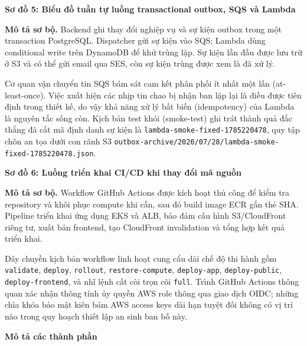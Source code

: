 \vspace{0.5em}\noindent\textbf{Sơ đồ 5: Biểu đồ tuần tự luồng transactional outbox, SQS và
Lambda}\par

\textbf{Mô tả sơ bộ.} Backend ghi thay đổi nghiệp vụ và sự kiện outbox
trong một transaction PostgreSQL. Dispatcher gửi sự kiện vào SQS; Lambda
dùng conditional write trên DynamoDB để khử trùng lặp. Sự kiện lần đầu
được lưu trữ ở S3 và có thể gửi email qua SES, còn sự kiện trùng được
xem là đã xử lý.

Cơ quan vận chuyển tin SQS bám sát cam kết phân phối ít nhất một lần
(at-least-once). Việc xuất hiện các nhịp tin chao bị nhận ban lặp lại là
điều được tiên định trong thiết kế, do vậy khả năng xử lý bất biến
(idempotency) của Lambda là nguyên tắc sống còn. Kịch bản test khói
(smoke-test) ghi trát thành quả đắc thắng đã cất mã định danh sự kiện là
\texttt{lambda-\allowbreak{}smoke-\allowbreak{}fixed-\allowbreak{}1785220478}, quy tập chôn an tọa dưới con
rãnh S3
\texttt{outbox-\allowbreak{}archive/\allowbreak{}2026/\allowbreak{}07/\allowbreak{}28/\allowbreak{}lambda-\allowbreak{}smoke-\allowbreak{}fixed-\allowbreak{}1785220478.\allowbreak{}json}.

\vspace{0.5em}\noindent\textbf{Sơ đồ 6: Luồng triển khai CI/CD khi thay đổi mã
nguồn}\par

\textbf{Mô tả sơ bộ.} Workflow GitHub Actions được kích hoạt thủ công để
kiểm tra repository và khôi phục compute khi cần, sau đó build image ECR
gắn thẻ SHA. Pipeline triển khai ứng dụng EKS và ALB, bảo đảm cấu hình
S3/CloudFront riêng tư, xuất bản frontend, tạo CloudFront invalidation
và tổng hợp kết quả triển khai.

Dây chuyền kịch bản workflow linh hoạt cung cẩu dải chế độ thi hành gồm
\texttt{validate}, \texttt{deploy}, \texttt{rollout},
\texttt{restore-\allowbreak{}compute}, \texttt{deploy-\allowbreak{}app}, \texttt{deploy-\allowbreak{}public},
\texttt{deploy-\allowbreak{}frontend}, và nhĩ lệnh cất còi trọn cõi \texttt{full}.
Trình GitHub Actions thông quan xác nhận thông tính ủy quyền AWS role
thông qua giao dịch OIDC; những chìa khóa bảo mật kiên bám AWS access
keys dài hạn tuyệt đối không có vị trí nào trong quy hoạch thiết lập an
sinh ban bố này.

\vspace{0.5em}\noindent\textbf{Mô tả các thành
phần}\par

